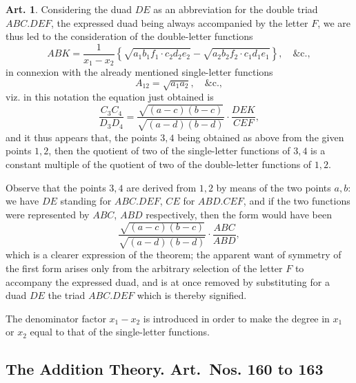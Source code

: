 \documentclass[11pt,a4paper]{article}
\theoremstyle{definition}
\newtheorem{art}{Art.}[section]
\begin{document}
\begin{art}
Considering the duad $DE$ as an abbreviation for the double triad $ABC.DEF$, the expressed duad being always accompanied by the letter $F$, we are thus led to the consideration of the double-letter functions
\[
ABK = \frac{1}{x_1-x_2}\left\{\sqrt{a_1b_1f_1 \cdot c_2d_2e_2} - \sqrt{a_2b_2f_2 \cdot c_1d_1e_1}\right\}, \quad \text{\&c.},
\]
in connexion with the already mentioned single-letter functions
\[
A_{12} = \sqrt{a_1a_2}, \quad \text{\&c.},
\]
viz. in this notation the equation just obtained is
\[
\frac{C_3C_4}{D_3D_4} = \frac{\sqrt{(a-c)(b-c)}}{\sqrt{(a-d)(b-d)}} \cdot \frac{DEK}{CEF},
\]
and it thus appears that, the points $3,4$ being obtained as above from the given points $1,2$, then the quotient of two of the single-letter functions of $3,4$ is a constant multiple of the quotient of two of the double-letter functions of $1,2$.

Observe that the points $3,4$ are derived from $1,2$ by means of the two points $a,b$: we have $DE$ standing for $ABC.DEF$, $CE$ for $ABD.CEF$, and if the two functions were represented by $ABC$, $ABD$ respectively, then the form would have been
\[
\frac{\sqrt{(a-c)(b-c)}}{\sqrt{(a-d)(b-d)}} \cdot \frac{ABC}{ABD},
\]
which is a clearer expression of the theorem; the apparent want of symmetry of the first form arises only from the arbitrary selection of the letter $F$ to accompany the expressed duad, and is at once removed by substituting for a duad $DE$ the triad $ABC.DEF$ which is thereby signified.

The denominator factor $x_1-x_2$ is introduced in order to make the degree in $x_1$ or $x_2$ equal to that of the single-letter functions.
\end{art}

\newpage
\subsection*{The Addition Theory. Art.~Nos. 160 to 163}
\end{document}
